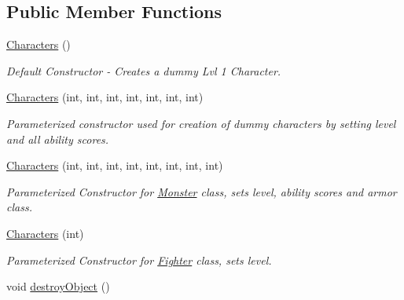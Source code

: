 \subsection*{Public Member Functions}
\begin{DoxyCompactItemize}
\item 
\hypertarget{class_characters_af131b231e05a7960369289684c89afad}{}\label{class_characters_af131b231e05a7960369289684c89afad} 
\hyperlink{class_characters_af131b231e05a7960369289684c89afad}{Characters} ()
\begin{DoxyCompactList}\small\item\em Default Constructor -\/ Creates a dummy Lvl 1 Character. \end{DoxyCompactList}\item 
\hypertarget{class_characters_a06862b46e26e981dad4c1dd3cb286c65}{}\label{class_characters_a06862b46e26e981dad4c1dd3cb286c65} 
\hyperlink{class_characters_a06862b46e26e981dad4c1dd3cb286c65}{Characters} (int, int, int, int, int, int, int)
\begin{DoxyCompactList}\small\item\em Parameterized constructor used for creation of dummy characters by setting level and all ability scores. \end{DoxyCompactList}\item 
\hypertarget{class_characters_aa8fd7da53eaf45404aa9a8e35885da43}{}\label{class_characters_aa8fd7da53eaf45404aa9a8e35885da43} 
\hyperlink{class_characters_aa8fd7da53eaf45404aa9a8e35885da43}{Characters} (int, int, int, int, int, int, int, int)
\begin{DoxyCompactList}\small\item\em Parameterized Constructor for \hyperlink{class_monster}{Monster} class, sets level, ability scores and armor class. \end{DoxyCompactList}\item 
\hypertarget{class_characters_a982bd095e88521e33817bc3ac4eb9607}{}\label{class_characters_a982bd095e88521e33817bc3ac4eb9607} 
\hyperlink{class_characters_a982bd095e88521e33817bc3ac4eb9607}{Characters} (int)
\begin{DoxyCompactList}\small\item\em Parameterized Constructor for \hyperlink{class_fighter}{Fighter} class, sets level. \end{DoxyCompactList}\item 
\hypertarget{class_characters_a6ec320af5d1526eed47070bca6e4d847}{}\label{class_characters_a6ec320af5d1526eed47070bca6e4d847} 
void \hyperlink{class_characters_a6ec320af5d1526eed47070bca6e4d847}{destroy\+Object} ()

\end{DoxyCompactItemize}
